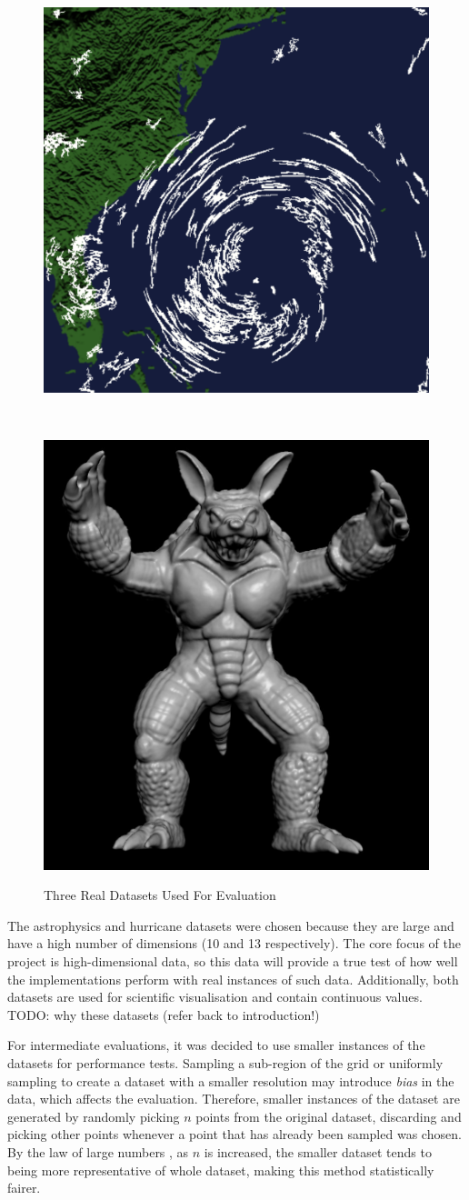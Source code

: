 \begin{figure}
\begin{center}
\begin{subfloat}{%
				\includegraphics[scale=0.25]{figures/hurricane_isabel.pdf}
			}
			\end{subfloat}~
			\begin{subfloat} {%
				\includegraphics[scale=0.15]{figures/armadillo.pdf}
			}
			\end{subfloat}			  
		\end{center}

		\caption{Three Real Datasets Used For Evaluation}
		\label{fig:synthetic-data}
\end{figure}

The astrophysics and hurricane datasets were chosen because they are large and have a high number of dimensions (10 and 13 respectively). The core focus of the project is high-dimensional data, so this data will provide a true test of how well the implementations perform with real instances of such data. Additionally, both datasets are used for scientific visualisation and contain continuous values. TODO: why these datasets (refer back to introduction!)

For intermediate evaluations, it was decided to use smaller instances of the datasets for performance tests. Sampling a sub-region of the grid or uniformly sampling to create a dataset with a smaller resolution may introduce \textit{bias} in the data, which affects the evaluation. Therefore, smaller instances of the dataset are generated by randomly picking $n$ points from the original dataset, discarding and picking other points whenever a point that has already been sampled was chosen. By the law of large numbers \cite{large-sample-theory}, as $n$ is increased, the smaller dataset tends to being more representative of whole dataset, making this method statistically fairer.

